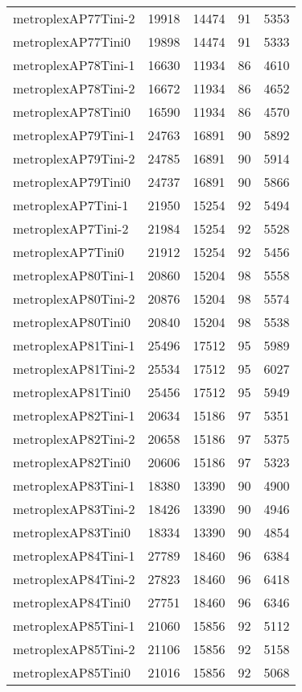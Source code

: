 \begin{longtable}{lrrrr}
metroplexAP77Tini-2 & 19918 & 14474 & 91 & 5353 \\
metroplexAP77Tini0 & 19898 & 14474 & 91 & 5333 \\
metroplexAP78Tini-1 & 16630 & 11934 & 86 & 4610 \\
metroplexAP78Tini-2 & 16672 & 11934 & 86 & 4652 \\
metroplexAP78Tini0 & 16590 & 11934 & 86 & 4570 \\
metroplexAP79Tini-1 & 24763 & 16891 & 90 & 5892 \\
metroplexAP79Tini-2 & 24785 & 16891 & 90 & 5914 \\
metroplexAP79Tini0 & 24737 & 16891 & 90 & 5866 \\
metroplexAP7Tini-1 & 21950 & 15254 & 92 & 5494 \\
metroplexAP7Tini-2 & 21984 & 15254 & 92 & 5528 \\
metroplexAP7Tini0 & 21912 & 15254 & 92 & 5456 \\
metroplexAP80Tini-1 & 20860 & 15204 & 98 & 5558 \\
metroplexAP80Tini-2 & 20876 & 15204 & 98 & 5574 \\
metroplexAP80Tini0 & 20840 & 15204 & 98 & 5538 \\
metroplexAP81Tini-1 & 25496 & 17512 & 95 & 5989 \\
metroplexAP81Tini-2 & 25534 & 17512 & 95 & 6027 \\
metroplexAP81Tini0 & 25456 & 17512 & 95 & 5949 \\
metroplexAP82Tini-1 & 20634 & 15186 & 97 & 5351 \\
metroplexAP82Tini-2 & 20658 & 15186 & 97 & 5375 \\
metroplexAP82Tini0 & 20606 & 15186 & 97 & 5323 \\
metroplexAP83Tini-1 & 18380 & 13390 & 90 & 4900 \\
metroplexAP83Tini-2 & 18426 & 13390 & 90 & 4946 \\
metroplexAP83Tini0 & 18334 & 13390 & 90 & 4854 \\
metroplexAP84Tini-1 & 27789 & 18460 & 96 & 6384 \\
metroplexAP84Tini-2 & 27823 & 18460 & 96 & 6418 \\
metroplexAP84Tini0 & 27751 & 18460 & 96 & 6346 \\
metroplexAP85Tini-1 & 21060 & 15856 & 92 & 5112 \\
metroplexAP85Tini-2 & 21106 & 15856 & 92 & 5158 \\
metroplexAP85Tini0 & 21016 & 15856 & 92 & 5068 \\

\end{longtable}
